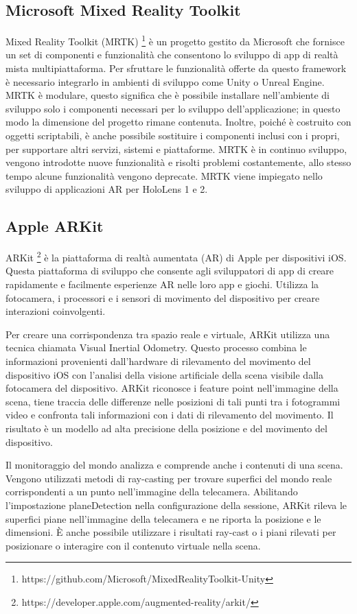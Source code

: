 \subsection{Microsoft Mixed Reality Toolkit}
Mixed Reality Toolkit (MRTK) \footnote{https://github.com/Microsoft/MixedRealityToolkit-Unity} è un progetto gestito da Microsoft che fornisce un set di componenti e funzionalità che consentono lo sviluppo di app di realtà mista multipiattaforma.
Per sfruttare le funzionalità offerte da questo framework è necessario integrarlo in ambienti di sviluppo come Unity o Unreal Engine.
MRTK è modulare, questo significa che è possibile installare nell'ambiente di sviluppo solo i componenti necessari per lo sviluppo dell’applicazione; in questo modo la dimensione del progetto rimane contenuta. Inoltre, poiché è costruito con oggetti scriptabili, è anche possibile sostituire i componenti inclusi con i propri, per supportare altri servizi, sistemi e piattaforme. 
MRTK è in continuo sviluppo, vengono introdotte nuove funzionalità e risolti problemi costantemente, allo stesso tempo alcune funzionalità vengono deprecate.
MRTK viene impiegato nello sviluppo di applicazioni AR per HoloLens 1 e 2.

\subsection{Apple ARKit}
ARKit \footnote{https://developer.apple.com/augmented-reality/arkit/} è la piattaforma di realtà aumentata (AR) di Apple per dispositivi iOS.
Questa piattaforma di sviluppo che consente agli sviluppatori di app di creare rapidamente e facilmente esperienze AR nelle loro app e giochi. Utilizza la fotocamera, i processori e i sensori di movimento del dispositivo per creare interazioni coinvolgenti.

Per creare una corrispondenza tra spazio reale e virtuale, ARKit utilizza una tecnica chiamata Visual Inertial Odometry. Questo processo combina le informazioni provenienti dall'hardware di rilevamento del movimento del dispositivo iOS con l'analisi della visione artificiale della scena visibile dalla fotocamera del dispositivo. ARKit riconosce i feature point nell'immagine della scena, tiene traccia delle differenze nelle posizioni di tali punti tra i fotogrammi video e confronta tali informazioni con i dati di rilevamento del movimento. Il risultato è un modello ad alta precisione della posizione e del movimento del dispositivo.

Il monitoraggio del mondo analizza e comprende anche i contenuti di una scena. Vengono utilizzati metodi di ray-casting per trovare superfici del mondo reale corrispondenti a un punto nell'immagine della telecamera. Abilitando l'impostazione planeDetection nella configurazione della sessione, ARKit rileva le superfici piane nell'immagine della telecamera e ne riporta la posizione e le dimensioni. È anche possibile utilizzare i risultati ray-cast o i piani rilevati per posizionare o interagire con il contenuto virtuale nella scena. 

